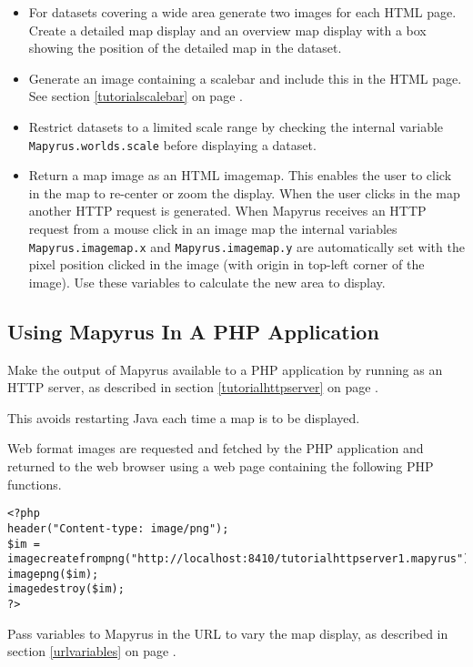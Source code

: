 \begin{itemize}
\item
For datasets covering a wide area generate two images for
each HTML page.  Create a detailed map display and an overview map display
with a box showing the position of the detailed map in the dataset.

\item
Generate an image containing a scalebar
and include this in the HTML page.  See section \ref{tutorialscalebar}
on page \pageref{tutorialscalebar}.

\item
Restrict datasets to a limited scale range by checking the
internal variable
\texttt{Mapyrus.worlds.scale} before displaying a dataset.

\item
Return a map image as an HTML imagemap.  This enables the user to click
in the map to re-center or zoom the display.  When the user clicks
in the map another HTTP request is generated.  When Mapyrus receives
an HTTP request from a mouse click in an image map the internal variables
\texttt{Mapyrus.imagemap.x} and
\texttt{Mapyrus.imagemap.y} are automatically set with the pixel position
clicked in the image (with origin in top-left corner of the image).
Use these variables to calculate the new area to display.
\end{itemize}

\subsection{Using Mapyrus In A PHP Application}

Make the output of Mapyrus available to a PHP application by running as an
HTTP server, as described in section \ref{tutorialhttpserver}
on page \pageref{tutorialhttpserver}.

This avoids restarting Java each time a map is to be displayed.

Web format images are requested and fetched by the PHP
application and returned to the web browser using a
web page containing the following PHP functions.

\begin{verbatim}
<?php
header("Content-type: image/png");
$im = imagecreatefrompng("http://localhost:8410/tutorialhttpserver1.mapyrus");
imagepng($im);
imagedestroy($im);
?>
\end{verbatim}

Pass variables to Mapyrus in the URL to vary the map display,
as described in section \ref{urlvariables}
on page \pageref{urlvariables}.

